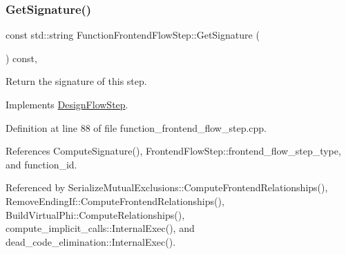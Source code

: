 \subsubsection{\texorpdfstring{Get\+Signature()}{GetSignature()}}
{\footnotesize\ttfamily const std\+::string Function\+Frontend\+Flow\+Step\+::\+Get\+Signature (\begin{DoxyParamCaption}{ }\end{DoxyParamCaption}) const\hspace{0.3cm}{\ttfamily [override]}, {\ttfamily [virtual]}}



Return the signature of this step. 



Implements \hyperlink{classDesignFlowStep_ab111e3d4058615c2dedc0505978d4699}{Design\+Flow\+Step}.



Definition at line 88 of file function\+\_\+frontend\+\_\+flow\+\_\+step.\+cpp.



References Compute\+Signature(), Frontend\+Flow\+Step\+::frontend\+\_\+flow\+\_\+step\+\_\+type, and function\+\_\+id.



Referenced by Serialize\+Mutual\+Exclusions\+::\+Compute\+Frontend\+Relationships(), Remove\+Ending\+If\+::\+Compute\+Frontend\+Relationships(), Build\+Virtual\+Phi\+::\+Compute\+Relationships(), compute\+\_\+implicit\+\_\+calls\+::\+Internal\+Exec(), and dead\+\_\+code\+\_\+elimination\+::\+Internal\+Exec().

